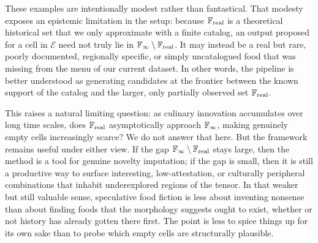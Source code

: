These examples are intentionally modest rather than fantastical.
That modesty exposes an epistemic limitation in the setup: because $\mathbb{F}_{\mathrm{real}}$ is a theoretical historical set that we only approximate with a finite catalog, an output proposed for a cell in $\mathcal{E}$ need not truly lie in $\mathbb{F}_{\infty} \setminus \mathbb{F}_{\mathrm{real}}$.
It may instead be a real but rare, poorly documented, regionally specific, or simply uncatalogued food that was missing from the menu of our current dataset.
In other words, the pipeline is better understood as generating candidates at the frontier between the known support of the catalog and the larger, only partially observed set $\mathbb{F}_{\mathrm{real}}$.

This raises a natural limiting question: as culinary innovation accumulates over long time scales, does $\mathbb{F}_{\mathrm{real}}$ asymptotically approach $\mathbb{F}_{\infty}$, making genuinely empty cells increasingly scarce?
We do not answer that here.
But the framework remains useful under either view.
If the gap $\mathbb{F}_{\infty} \setminus \mathbb{F}_{\mathrm{real}}$ stays large, then the method is a tool for genuine novelty imputation; if the gap is small, then it is still a productive way to surface interesting, low-attestation, or culturally peripheral combinations that inhabit underexplored regions of the tensor.
In that weaker but still valuable sense, speculative food fiction is less about inventing nonsense than about finding foods that the morphology suggests ought to exist, whether or not history has already gotten there first. The point is less to spice things up for its own sake than to probe which empty cells are structurally plausible.

